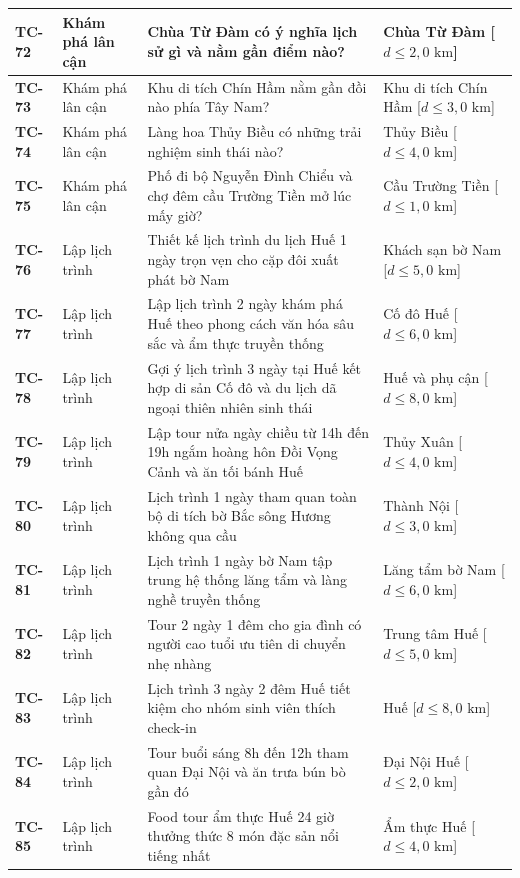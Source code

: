 \begin{longtable}{|>{\centering\arraybackslash\bfseries}p{1.35cm}|>{\raggedright\arraybackslash}p{2.6cm}|>{\raggedright\arraybackslash}p{6.35cm}|>{\raggedright\arraybackslash}p{4.3cm}|}
TC-72 & Khám phá lân cận & Chùa Từ Đàm có ý nghĩa lịch sử gì và nằm gần điểm nào? & Chùa Từ Đàm [$d \le 2{,}0\text{ km}$] \\ \hline
TC-73 & Khám phá lân cận & Khu di tích Chín Hầm nằm gần đồi nào phía Tây Nam? & Khu di tích Chín Hầm [$d \le 3{,}0\text{ km}$] \\ \hline
TC-74 & Khám phá lân cận & Làng hoa Thủy Biều có những trải nghiệm sinh thái nào? & Thủy Biều [$d \le 4{,}0\text{ km}$] \\ \hline
TC-75 & Khám phá lân cận & Phố đi bộ Nguyễn Đình Chiểu và chợ đêm cầu Trường Tiền mở lúc mấy giờ? & Cầu Trường Tiền [$d \le 1{,}0\text{ km}$] \\ \hline
TC-76 & Lập lịch trình & Thiết kế lịch trình du lịch Huế 1 ngày trọn vẹn cho cặp đôi xuất phát bờ Nam & Khách sạn bờ Nam [$d \le 5{,}0\text{ km}$] \\ \hline
TC-77 & Lập lịch trình & Lập lịch trình 2 ngày khám phá Huế theo phong cách văn hóa sâu sắc và ẩm thực truyền thống & Cố đô Huế [$d \le 6{,}0\text{ km}$] \\ \hline
TC-78 & Lập lịch trình & Gợi ý lịch trình 3 ngày tại Huế kết hợp di sản Cố đô và du lịch dã ngoại thiên nhiên sinh thái & Huế và phụ cận [$d \le 8{,}0\text{ km}$] \\ \hline
TC-79 & Lập lịch trình & Lập tour nửa ngày chiều từ 14h đến 19h ngắm hoàng hôn Đồi Vọng Cảnh và ăn tối bánh Huế & Thủy Xuân [$d \le 4{,}0\text{ km}$] \\ \hline
TC-80 & Lập lịch trình & Lịch trình 1 ngày tham quan toàn bộ di tích bờ Bắc sông Hương không qua cầu & Thành Nội [$d \le 3{,}0\text{ km}$] \\ \hline
TC-81 & Lập lịch trình & Lịch trình 1 ngày bờ Nam tập trung hệ thống lăng tẩm và làng nghề truyền thống & Lăng tẩm bờ Nam [$d \le 6{,}0\text{ km}$] \\ \hline
TC-82 & Lập lịch trình & Tour 2 ngày 1 đêm cho gia đình có người cao tuổi ưu tiên di chuyển nhẹ nhàng & Trung tâm Huế [$d \le 5{,}0\text{ km}$] \\ \hline
TC-83 & Lập lịch trình & Lịch trình 3 ngày 2 đêm Huế tiết kiệm cho nhóm sinh viên thích check-in & Huế [$d \le 8{,}0\text{ km}$] \\ \hline
TC-84 & Lập lịch trình & Tour buổi sáng 8h đến 12h tham quan Đại Nội và ăn trưa bún bò gần đó & Đại Nội Huế [$d \le 2{,}0\text{ km}$] \\ \hline
TC-85 & Lập lịch trình & Food tour ẩm thực Huế 24 giờ thưởng thức 8 món đặc sản nổi tiếng nhất & Ẩm thực Huế [$d \le 4{,}0\text{ km}$] \\ \hline

\end{longtable}
